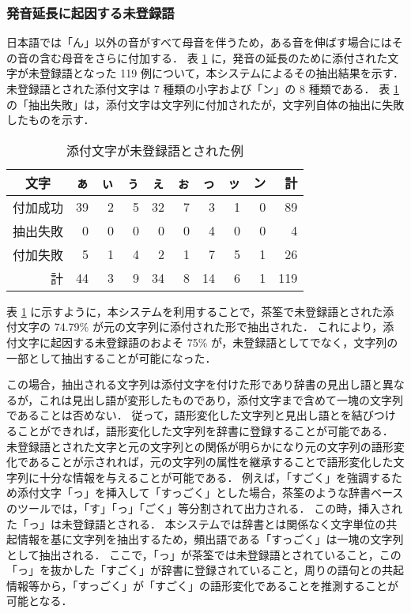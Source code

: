 \subsubsection{発音延長に起因する未登録語}
\label{sec:pronunciation-extension}
日本語では「ん」以外の音がすべて母音を伴うため，ある音を伸ばす場合にはその音の含む母音をさらに付加する．
表 \ref{tab:unkrepsmall} に，発音の延長のために添付された文字が未登録語となった 119 例について，本システムによるその抽出結果を示す．
未登録語とされた添付文字は 7 種類の小字および「ン」の 8 種類である．
表 \ref{tab:unkrepsmall} の「抽出失敗」は，添付文字は文字列に付加されたが，文字列自体の抽出に失敗したものを示す．
\begin{table}[hbt]
\begin{minipage}{\textwidth}
\begin{center}
\caption{添付文字が未登録語とされた例}
\label{tab:unkrepsmall}
\begin{tabular}{crrrrrrrrr}
\hline
\hline
文字                  & ぁ & ぃ & ぅ & ぇ & ぉ & っ & ッ & ン &  計 \\
\hline
付加成功              & 39 &  2 &  5 & 32 &  7 &  3 &  1 &  0 &  89 \\
抽出失敗              &  0 &  0 &  0 &  0 &  0 &  4 &  0 &  0 &   4 \\ 
付加失敗              &  5 &  1 &  4 &  2 &  1 &  7 &  5 &  1 &  26 \\
\hline
\multicolumn{1}{r}{計}& 44 &  3 &  9 & 34 &  8 & 14 &  6 &  1 & 119 \\
\hline
\hline
\end{tabular}
\end{center}
\end{minipage}
\end{table}

表 \ref{tab:unkrepsmall} に示すように，本システムを利用することで，茶筌で未登録語とされた添付文字の 74.79\% が元の文字列に添付された形で抽出された．
これにより，添付文字に起因する未登録語のおよそ 75\% が，未登録語としてでなく，文字列の一部として抽出することが可能になった．

この場合，抽出される文字列は添付文字を付けた形であり辞書の見出し語と異なるが，これは見出し語が変形したものであり，添付文字まで含めて一塊の文字列であることは否めない．
従って，語形変化した文字列と見出し語とを結びつけることができれば，語形変化した文字列を辞書に登録することが可能である．
未登録語とされた文字と元の文字列との関係が明らかになり元の文字列の語形変化であることが示されれば，元の文字列の属性を継承することで語形変化した文字列に十分な情報を与えることが可能である．
例えば，「すごく」を強調するため添付文字「っ」を挿入して「すっごく」とした場合，茶筌のような辞書ベースのツールでは，「す」「っ」「ごく」等分割されて出力される．
この時，挿入された「っ」は未登録語とされる．
本システムでは辞書とは関係なく文字単位の共起情報を基に文字列を抽出するため，頻出語である「すっごく」は一塊の文字列として抽出される．
ここで，「っ」が茶筌では未登録語とされていること，この「っ」を抜かした「すごく」が辞書に登録されていること，周りの語句との共起情報等から，「すっごく」が「すごく」の語形変化であることを推測することが可能となる．

